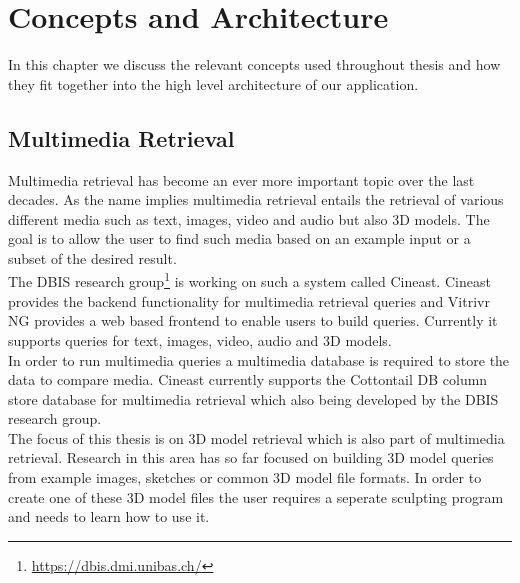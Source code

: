 \chapter{Concepts and Architecture}

In this chapter we discuss the relevant concepts used throughout thesis and how they fit together into the high level architecture of our
application.




\section{Multimedia Retrieval}

Multimedia retrieval has become an ever more important topic over the last decades. As the name implies multimedia retrieval entails the retrieval of various different media such as text, images, video and audio but also
3D models. The goal is to allow the user to find such media based on an example input or a subset of the desired result.\\
The DBIS research group\footnote{\url{https://dbis.dmi.unibas.ch/}} is working on such a system called Cineast. Cineast provides the backend functionality for multimedia retrieval queries and Vitrivr NG provides a web
based frontend to enable users to build queries. Currently it supports queries for text, images, video, audio and 3D models.\\
In order to run multimedia queries a multimedia database is required to store the data to compare media. Cineast currently supports the Cottontail DB column store database for multimedia retrieval which also being developed by the DBIS research group.\\
The focus of this thesis is on 3D model retrieval which is also part of multimedia retrieval. Research in this area has so far focused on building 3D model queries from example images, sketches or common 3D model file formats.
In order to create one of these 3D model files the user requires a seperate sculpting program and needs to learn how to use it.


